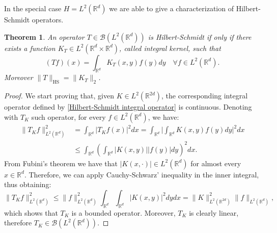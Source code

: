 \documentclass[corpo=11pt, stile=classica, tipotesi=custom,
greek, evenboxes, english]{toptesi}
\numberwithin{equation}{chapter}
\newtheorem{teo}{Theorem}[chapter] %
\theoremstyle{definition}
\theoremstyle{remark}
\newcommand{\R}{\mathbb{R}} %
\newcommand{\B}{\mathscr{B}} %
\begin{document}
In the special case $H = L^2(\R^d)$ we are able to give a characterization of Hilbert-Schmidt operators.
\begin{teo}\label{representation of Hilbert-Schmidt integral operator}
	An operator $T \in \B(L^2(\R^d))$ is Hilbert-Schmidt if only if there exists a function $K_T \in L^2(\R^d \times \R^d)$, called integral kernel, such that
	\begin{equation}\label{Hilbert-Schmidt integral operator}
		(Tf)(x) = \int_{\R^d} K_T(x,y)f(y)dy \quad \forall f \in L^2(\R^d).
	\end{equation}
	Moreover $\|T\|_{\mathrm{HS}} = \|K_T\|_2$.
\end{teo}
\begin{proof}
	We start proving that, given $K \in L^2(\R^{2d})$, the corresponding integral operator defined by \eqref{Hilbert-Schmidt integral operator} is continuous. Denoting with $T_K$ such operator, for every $f \in L^2(\R^d)$, we have:
	\begin{align*}
		\| T_K f \|_{L^2(\R^d)}^2 &= \int_{\R^{d}} |T_K f(x)|^2 dx = \int_{\R^d} \Big|\int_{\R^{d}} K(x,y) f(y) dy\Big|^2 dx\\
						&\leq \int_{\R^d} \left(\int_{\R^{d}} |K(x,y)| |f(y)| dy\right)^2 dx.
	\end{align*}
	From Fubini's theorem we have that $|K(x,\cdot)| \in L^2(\R^d)$ for almost every $x \in \R^d$. Therefore, we can apply Cauchy-Schwarz' inequality in the inner integral, thus obtaining:
	\begin{equation}\label{representation of Hilbert-Schmidt integral operator bound 1}
		\| T_K f \|_{L^2(\R^d)}^2 \leq \|f\|_{L^2(\R^d)}^2 \int_{\R^d} \int_{\R^{d}} |K(x,y)|^2 dy dx = \| K \|_{L^2(\R^{2d})}^2 \|f\|_{L^2(\R^d)},
	\end{equation}
	which shows that $T_K$ is a bounded operator. Moreover, $T_K$ is clearly linear, therefore $T_K \in \B(L^2(\R^d))$. 
	

\end{proof}
\end{document}
